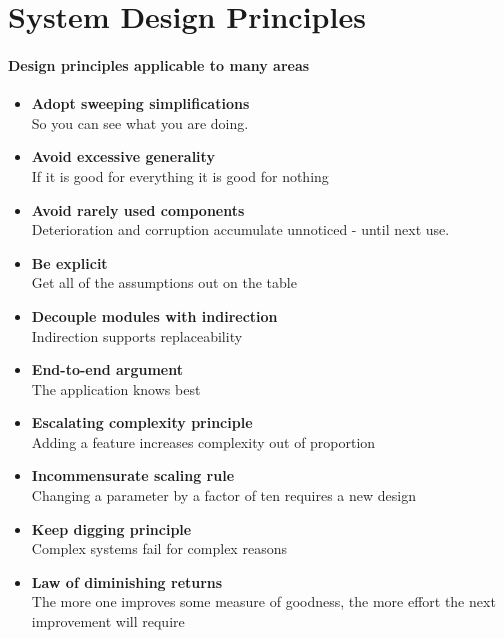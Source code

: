 \section{System Design Principles}

\paragraph{Design principles applicable to many areas}
\begin{itemize}
\item \textbf{Adopt sweeping simplifications} \\
  So you can see what you are doing.

\item \textbf{Avoid excessive generality} \\
  If it is good for everything it is good for nothing

\item \textbf{Avoid rarely used components} \\
  Deterioration and corruption accumulate unnoticed - until next use.

\item \textbf{Be explicit} \\
  Get all of the assumptions out on the table

\item \textbf{Decouple modules with indirection} \\
  Indirection supports replaceability

\item \textbf{End-to-end argument} \\
  The application knows best

\item \textbf{Escalating complexity principle} \\
  Adding a feature increases complexity out of proportion

\item \textbf{Incommensurate scaling rule} \\
  Changing a parameter by a factor of ten requires a new design

\item \textbf{Keep digging principle} \\
  Complex systems fail for complex reasons

\item \textbf{Law of diminishing returns} \\
  The more one improves some measure of goodness, the more effort
  the next improvement will require


\end{itemize}
